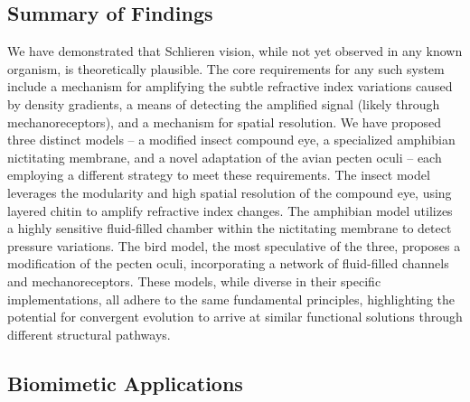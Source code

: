 \documentclass[11pt]{article}
\begin{document}
\subsection{Summary of Findings}

We have demonstrated that Schlieren vision, while not yet observed in any known organism, is theoretically plausible. The core requirements for any such system include a mechanism for amplifying the subtle refractive index variations caused by density gradients, a means of detecting the amplified signal (likely through mechanoreceptors), and a mechanism for spatial resolution. We have proposed three distinct models – a modified insect compound eye, a specialized amphibian nictitating membrane, and a novel adaptation of the avian pecten oculi – each employing a different strategy to meet these requirements. The insect model leverages the modularity and high spatial resolution of the compound eye, using layered chitin to amplify refractive index changes. The amphibian model utilizes a highly sensitive fluid-filled chamber within the nictitating membrane to detect pressure variations. The bird model, the most speculative of the three, proposes a modification of the pecten oculi, incorporating a network of fluid-filled channels and mechanoreceptors. These models, while diverse in their specific implementations, all adhere to the same fundamental principles, highlighting the potential for convergent evolution to arrive at similar functional solutions through different structural pathways.

\subsection{Biomimetic Applications}
\end{document}
